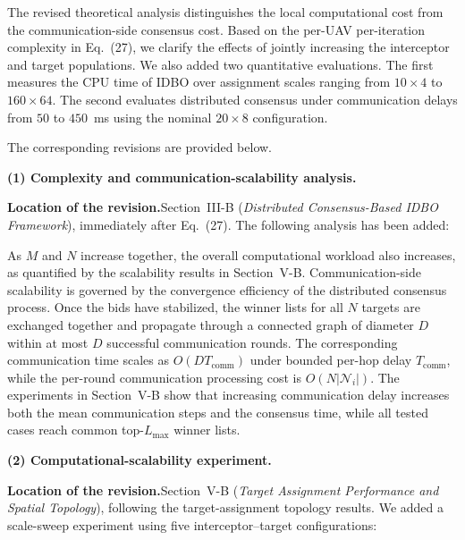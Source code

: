 \documentclass[11pt]{article}
\newcommand{\hladd}[1]{{\color{addblue}#1}}
\newcommand{\loc}{\medskip\noindent\textbf{Location of the revision.}\quad}
\begin{document}
The revised theoretical analysis distinguishes the local computational cost
from the communication-side consensus cost. Based on the per-UAV
per-iteration complexity in Eq.~(27), we clarify the effects of jointly
increasing the interceptor and target populations. 
We also added two quantitative evaluations. The first measures the CPU time
of IDBO over assignment scales ranging from $10\times4$ to $160\times64$.
The second evaluates distributed consensus under communication delays from
$50$ to $450$~ms using the nominal $20\times8$ configuration. 

The corresponding revisions are provided below.



\medskip
\noindent\textbf{(1) Complexity and communication-scalability analysis.}

\loc Section~III-B (\emph{Distributed Consensus-Based IDBO Framework}),
immediately after Eq.~(27). The following
analysis has been added:

\begin{tcolorbox}[enhanced,breakable,colback=white,colframe=addblue!55,
boxrule=0.6pt,arc=2pt,left=9pt,right=9pt,top=7pt,bottom=7pt]
\hladd{As $M$ and $N$ increase together, the overall computational workload
also increases, as quantified by the scalability results in Section~V-B.
Communication-side scalability is governed by the convergence efficiency of
the distributed consensus process. Once the bids have stabilized, the winner
lists for all $N$ targets are exchanged together and propagate through a
connected graph of diameter $D$ within at most $D$ successful communication
rounds. The corresponding communication time scales as
$O(DT_{\mathrm{comm}})$ under bounded per-hop delay
$T_{\mathrm{comm}}$, while the per-round communication processing cost is
$O(N|\mathcal{N}_i|)$. The experiments in Section~V-B show that increasing
communication delay increases both the mean communication steps and the
consensus time, while all tested cases reach common top-$L_{\max}$ winner
lists.}
\end{tcolorbox}

\medskip
\noindent\textbf{(2) Computational-scalability experiment.}

\loc Section~V-B (\emph{Target Assignment Performance and Spatial
Topology}), following the target-assignment topology results. We added a
scale-sweep experiment using five interceptor--target configurations:
\end{document}
